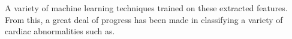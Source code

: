 \documentclass[titlepage]{scrartcl}
\begin{document}
        
A variety of machine learning techniques trained on these extracted
features. From this, a great deal of progress has been made in classifying a
variety of cardiac abnormalities such as. 

\pagebreak{}
\printbibliography{}
\end{document}
